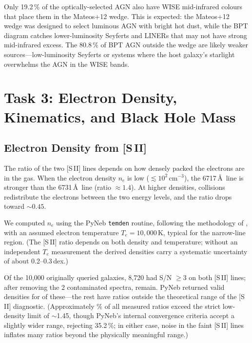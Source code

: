 \documentclass[a4paper,12pt]{article}
\begin{document}
Only 19.2\,\% of the optically-selected AGN also have WISE mid-infrared
colours that place them in the Mateos+12 wedge.  This is expected: the
Mateos+12 wedge was designed to select luminous AGN with bright hot
dust, while the BPT diagram catches lower-luminosity Seyferts and
LINERs that may not have strong mid-infrared excess.  The 80.8\,\% of
BPT AGN outside the wedge are likely weaker sources---low-luminosity
Seyferts or systems where the host galaxy's starlight overwhelms
the AGN in the WISE bands.

\section{Task 3: Electron Density, Kinematics, and Black Hole Mass}
\label{sec:task3}

\subsection{\texorpdfstring{Electron Density from [S\,II]}{Electron Density from [S II]}}

The ratio of the two [S\,II] lines depends on how densely packed the
electrons are in the gas.  When the electron density $n_e$ is low
($\lesssim 10^2$\,cm$^{-3}$), the 6717\,\AA\ line is stronger than the
6731\,\AA\ line (ratio $\approx 1.4$).  At higher densities, collisions
redistribute the electrons between the two energy levels, and the ratio
drops toward $\sim 0.45$.

We computed $n_e$ using the PyNeb \texttt{temden} routine,
following the methodology of \citet{sanders2016}, with an assumed electron temperature
$T_e = 10,000$\,K, typical for the narrow-line region.  (The [S\,II]
ratio depends on both density and temperature; without an independent
$T_e$ measurement the derived densities carry a systematic uncertainty
of about 0.2--0.3\,dex.)

Of the 10,000 originally queried galaxies, 8,720 had S/N $\ge 3$ on both
[S\,II] lines; after removing the 2 contaminated spectra, \siiSample{} remain.
PyNeb returned valid densities for \neValid{} of these---the rest have
ratios outside the theoretical range of the [S\,II] diagnostic.
(Approximately \siiAboveLimitPct{}\% of all measured ratios exceed the strict
low-density limit of $\sim$1.45, though PyNeb's internal convergence
criteria accept a slightly wider range, rejecting 35.2\,\%; in either
case, noise in the faint [S\,II] lines inflates many ratios beyond the
physically meaningful range.)
\end{document}
